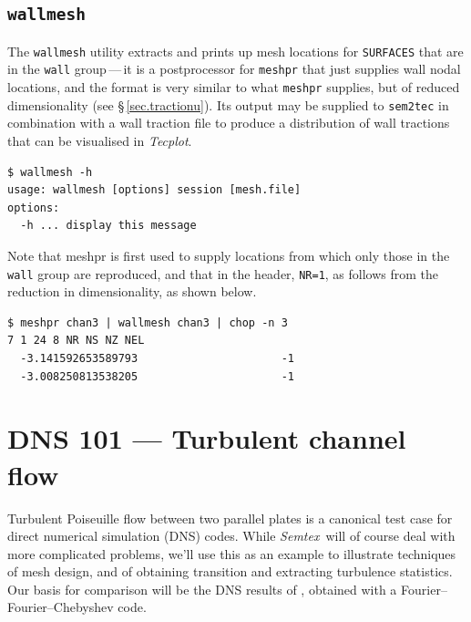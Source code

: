 \documentclass[11pt]{report}
\newcommand{\Semtex}{\emph{Semtex}} \newcommand{\Dog}{\emph{Dog}}
\newcommand{\Tecplot}{\emph{Tecplot}}
\begin{document}
\section{\texttt{wallmesh}}
\label{sec.wallmesh}

The \verb|wallmesh| utility extracts and prints up mesh locations for
\verb|SURFACES| that are in the \verb|wall| group\,---\,it is a
postprocessor for \verb|meshpr| that just supplies wall nodal
locations, and the format is very similar to what \verb|meshpr|
supplies, but of reduced dimensionality (see \S\,\ref{sec.tractionu}).
Its output may be supplied to \verb|sem2tec| in combination with a
wall traction file to produce a distribution of wall tractions that
can be visualised in \Tecplot.
%
{\small
\begin{verbatim}
$ wallmesh -h
usage: wallmesh [options] session [mesh.file]
options:
  -h ... display this message
\end{verbatim}
}
%
Note that meshpr is first used to supply locations from which only
those in the \verb|wall| group are reproduced, and that in the header,
\verb|NR=1|, as follows from the reduction in dimensionality, as shown
below.  {\small
\begin{verbatim}
$ meshpr chan3 | wallmesh chan3 | chop -n 3
7 1 24 8 NR NS NZ NEL
  -3.141592653589793                      -1
  -3.008250813538205                      -1
\end{verbatim}
}
%


\chapter{DNS 101 --- Turbulent channel flow}
\label{ch.dns101}


Turbulent Poiseuille flow between two parallel plates is a canonical
test case for direct numerical simulation (DNS) codes.  While
\Semtex\ will of course deal with more complicated problems, we'll use
this as an example to illustrate techniques of mesh design, and of
obtaining transition and extracting turbulence statistics.  Our basis
for comparison will be the DNS results of \citet*{kmm87}, obtained
with a Fourier--Fourier--Chebyshev code.
\end{document}
